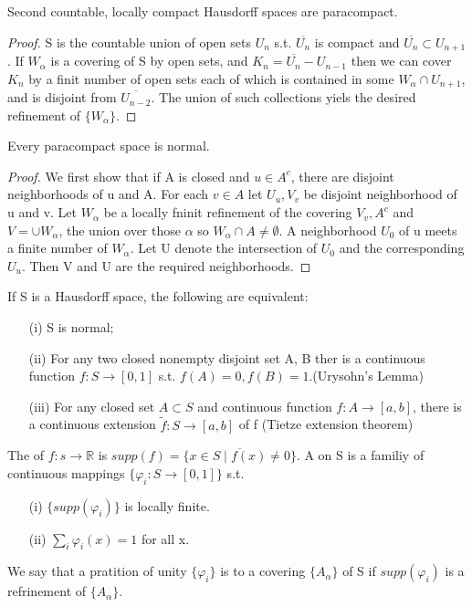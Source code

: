 \begin{thm}
Second countable, locally compact Hausdorff spaces are paracompact.
\end{thm}
\begin{proof}
S is the countable union of open sets $U_n$ s.t. $\overline{U_n}$ is compact and $\overline{U_n}\subset U_{n+1}$. If $W_\alpha$ is a covering
of S by open sets, and $K_n=\overline{U_n}-U_{n-1}$ then we can cover $K_n$ by a finit number of open sets each of which is contained in some
$W_\alpha\cap U_{n+1}$, and is disjoint from $\overline{U_{n-2}}$. The union of such collections yiels the desired refinement of $\{W_\alpha\}$.
\end{proof}
\begin{thm}
Every paracompact space is normal.
\end{thm}
\begin{proof}
We first show that if A is closed and $u\in A^c$, there are disjoint neighborhoods of u and A. For each $v\in A$ let $U_u, V_v$ be disjoint
neighborhood of u and v. Let $W_\alpha$ be a locally fninit refinement of the covering $V_v, A^c$ and $V=\cup W_\alpha$, the union over those
$\alpha$ so $W_\alpha\cap A\neq \emptyset$. A neighborhood $U_0$ of u meets a finite number of $W_\alpha$. Let U denote the intersection of
$U_0$ and the corresponding $U_u$. Then V and U are the required neighborhoods.
\end{proof}
\begin{thm}
If S is a Hausdorff space, the following are equivalent:
\begin{enumerate}
\item[(i)] S is normal;
\item[(ii)] For any two closed nonempty disjoint set A, B ther is a continuous function $f:S\rightarrow [0,1]$ s.t. $f(A)=0,f(B)=1$.(Urysohn's Lemma)
\item[(iii)] For any closed set $A\subset S$ and continuous function $f:A\rightarrow [a,b]$, there is a continuous extension $\tilde{f}:S
\rightarrow [a,b]$ of f (Tietze extension theorem)
\end{enumerate}
\end{thm}
\begin{definition}
The  of $f:s\rightarrow \mathbb{R}$ is $supp(f)=\overline{\lbrace x\in S\mid f(x)\neq 0\rbrace}$. A  on S
is a familiy of continuous mappings $\lbrace \varphi_i:S\rightarrow [0,1]\rbrace$ s.t.
\begin{enumerate}
\item[(i)] $\lbrace supp(\varphi_i)\rbrace$ is locally finite.
\item[(ii)] $\sum_i\varphi_i(x)=1$ for all x.
\end{enumerate}
We say that a pratition of unity $\{\varphi_i\}$ is  to a covering $\{A_\alpha\}$ of S if $supp(\varphi_i)$ is a refrinement
of $\{A_\alpha\}$.
\end{definition}
